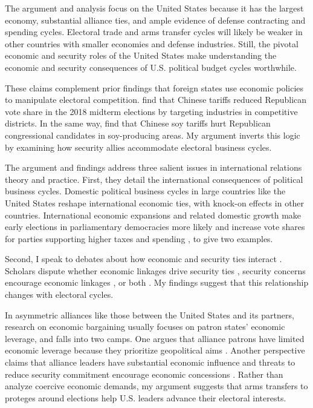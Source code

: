 \documentclass[12pt]{article}
\begin{document}
The argument and analysis focus on the United States because it has the largest economy, substantial alliance ties, and ample evidence of defense contracting and spending cycles. 
Electoral trade and arms transfer cycles will likely be weaker in other countries with smaller economies and defense industries. 
Still, the pivotal economic and security roles of the United States make understanding the economic and security consequences of U.S. political budget cycles worthwhile.


These claims complement prior findings that foreign states use economic policies to manipulate electoral competition. 
\citet{KimMargalit2021} find that Chinese tariffs reduced Republican vote share in the 2018 midterm elections by targeting industries in competitive districts.
In the same way, \cite{ChyzhUrbatsch2021} find that Chinese soy tariffs hurt Republican congressional candidates in soy-producing areas. 
My argument inverts this logic by examining how security allies accommodate electoral business cycles. 


The argument and findings address three salient issues in international relations theory and practice. 
First, they detail the international consequences of political business cycles. 
Domestic political business cycles in large countries like the United States reshape international economic ties, with knock-on effects in other countries.
International economic expansions and related domestic growth make early elections in parliamentary democracies more likely \citep{Kayser2006} and increase vote shares for parties supporting higher taxes and spending \citep{Kayser2009}, to give two examples.


Second, I speak to debates about how economic and security ties interact \citep{Mastanduno2009, Poast2019}. 
Scholars dispute whether economic linkages drive security ties \citep{BiglaiserDeRouen2007, Fordham2010, Kimball2010}, security concerns encourage economic linkages \citep{Gowa1995, Li2003, LongLeeds2006, GowaMansfield2004}, or both \citep{BiglaiserDeRouen2009, KinneBunte2018}. 
My findings suggest that this relationship changes with electoral cycles.


In asymmetric alliances like those between the United States and its partners, research on economic bargaining usually focuses on patron states' economic leverage, and falls into two camps. 
One argues that alliance patrons have limited economic leverage because they prioritize geopolitical aims \citep{Drezner2013, WolfordKim2017}.
Another perspective claims that alliance leaders have substantial economic influence \citep{Norrlof2010, Brooksetal2013} and threats to reduce security commitment encourage economic concessions \citep[pg. 122]{Oatley2015}.
Rather than analyze coercive economic demands, my argument suggests that arms transfers to proteges around elections help U.S. leaders advance their electoral interests.
\end{document}
